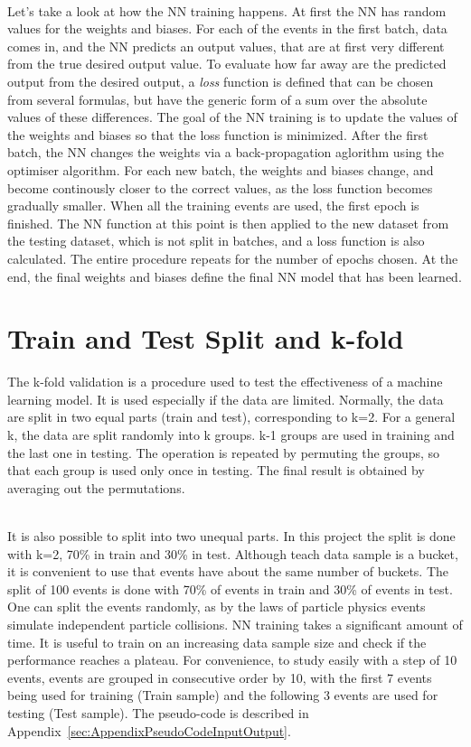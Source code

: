 \ \\ Let's take a look at how the NN training happens. At first the NN has random values for the weights and biases. For each of the events in the first batch, data comes in, and the NN predicts an output values, that are at first very different from the true desired output value. To evaluate how far away are the predicted output from the desired output, a \emph{loss} function is defined that can be chosen from several formulas, but have the generic form of a sum over the absolute values of these differences. The goal of the NN training is to update the values of the weights and biases so that the loss function is minimized. After the first batch, the NN changes the weights via a back-propagation aglorithm using the optimiser algorithm. For each new batch, the weights and biases change, and become continously closer to the correct values, as the loss function becomes gradually smaller. When all the training events are used, the first epoch is finished. The NN function at this point is then applied to the new dataset from the testing dataset, which is not split in batches, and a loss function is also calculated. The entire procedure repeats for the number of epochs chosen. At the end, the final weights and biases define the final NN model that has been learned.

\section{Train and Test Split and k-fold}
\label{sec:TrainAndTest}

The k-fold validation is a procedure used to test the effectiveness of a machine learning model. It is used especially if the data are limited. Normally, the data are split in two equal parts (train and test), corresponding to k=2. For a general k, the data are split randomly into k groups. k-1 groups are used in training and the last one in testing. The operation is repeated by permuting the groups, so that each group is used only once in testing. The final result is obtained by averaging out the permutations.

\ \\It is also possible to split into two unequal parts. In this project the split is done with k=2, 70\% in train and 30\% in test. Although teach data sample is a bucket, it is convenient to use that events have about the same number of buckets. The split of 100 events is done with 70\% of events in train and 30\% of events in test. One can split the events randomly, as by the laws of particle physics events simulate independent particle collisions. NN training takes a significant amount of time. It is useful to train on an increasing data sample size and check if the performance reaches a plateau. For convenience, to study easily with a step of 10 events, events are grouped in consecutive order by 10, with the first 7 events being used for training (Train sample) and the following 3 events are used for testing (Test sample). The pseudo-code is described in Appendix~\ref{sec:AppendixPseudoCodeInputOutput}.

